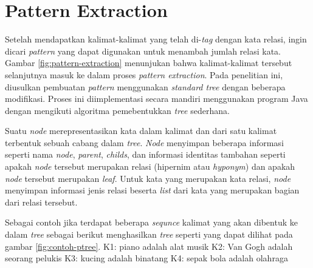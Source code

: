 %
\section{Pattern Extraction}
Setelah mendapatkan kalimat-kalimat yang telah di-\textit{tag} dengan kata relasi, ingin dicari \textit{pattern} yang dapat digunakan untuk menambah jumlah relasi kata. Gambar \ref{fig:pattern-extraction} menunjukan bahwa kalimat-kalimat tersebut selanjutnya masuk ke dalam proses \textit{pattern extraction}. Pada penelitian ini, diusulkan pembuatan \textit{pattern} menggunakan \textit{standard tree} dengan beberapa modifikasi. Proses ini diimplementasi secara mandiri menggunakan program Java dengan mengikuti algoritma pemebentukkan \textit{tree} sederhana.

Suatu \textit{\textit{node}} merepresentasikan kata dalam kalimat dan dari satu kalimat terbentuk sebuah cabang dalam \textit{tree}. \textit{Node} menyimpan beberapa informasi seperti nama \textit{\textit{node}}, \textit{parent}, \textit{childs}, dan informasi identitas tambahan seperti apakah \textit{\textit{node}} tersebut merupakan relasi (hipernim atau \textit{hyponym}) dan apakah \textit{\textit{node}} tersebut merupakan \textit{leaf}. Untuk kata yang merupakan kata relasi, \textit{\textit{node}} menyimpan informasi jenis relasi beserta \textit{list} dari kata yang merupakan bagian dari relasi tersebut. 

Sebagai contoh jika terdapat beberapa \textit{sequnce} kalimat yang akan dibentuk ke dalam \textit{tree} sebagai berikut menghasilkan \textit{tree} seperti yang dapat dilihat pada gambar \ref{fig:contoh-ptree}.
K1: {\tagHyponym}piano{\tagHyponym} adalah {\tagHypernym}alat musik{\tagHypernym}
K2: {\tagHyponym}Van Gogh{\tagHyponym} adalah seorang {\tagHypernym}pelukis{\tagHypernym}
K3: {\tagHyponym}kucing{\tagHyponym} adalah {\tagHypernym}binatang{\tagHypernym}
K4: {\tagHyponym}sepak bola{\tagHyponym} adalah {\tagHypernym}olahraga{\tagHypernym}

